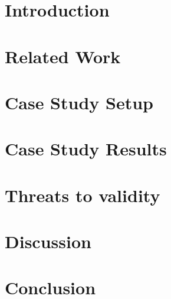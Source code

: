 \documentclass[10pt, conference]{IEEEtran}
\begin{document}
\section{Introduction}
\label{sec:introduction}


\section{Related Work}
\label{sec:related_work}


\section{Case Study Setup}
\label{sec:case_study_setup}


\section{Case Study Results}
\label{sec:results}


\section{Threats to validity}
\label{sec:threats_to_validity}


\section{Discussion}
\label{sec:discussion}


\section{Conclusion}
\label{sec:conclusion}




\end{document}
